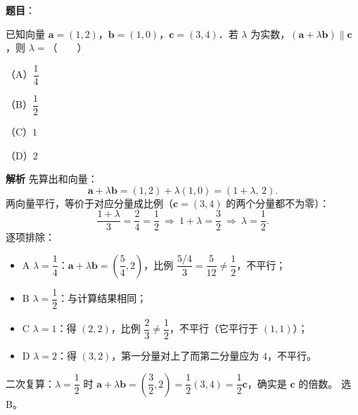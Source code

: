 \begin{answer}

\textbf{题目}：

已知向量 $\boldsymbol a=(1,2)$，$\boldsymbol b=(1,0)$，$\boldsymbol c=(3,4)$．若 $\lambda$ 为实数，$(\boldsymbol a+\lambda\boldsymbol b)\parallel\boldsymbol c$，则 $\lambda=$\mbox{（　　）}

（A）$\dfrac14$

（B）$\dfrac12$

（C）$1$

（D）$2$

\textbf{解析}
先算出和向量：
\nopagebreak[4]
\[
\boldsymbol a+\lambda\boldsymbol b=(1,2)+\lambda(1,0)=(1+\lambda,\,2).
\]
两向量平行，等价于对应分量成比例（$\boldsymbol c=(3,4)$ 的两个分量都不为零）：
\nopagebreak[4]
\[
\frac{1+\lambda}{3}=\frac{2}{4}=\frac12\ \Longrightarrow\ 1+\lambda=\frac32\ \Longrightarrow\ \lambda=\frac12.
\]
逐项排除：
\begin{itemize}
\item A $\lambda=\dfrac14$：$\boldsymbol a+\lambda\boldsymbol b=\left(\dfrac54,2\right)$，比例 $\dfrac{5/4}{3}=\dfrac{5}{12}\neq\dfrac12$，不平行；
\item B $\lambda=\dfrac12$：与计算结果相同；
\item C $\lambda=1$：得 $(2,2)$，比例 $\dfrac23\neq\dfrac12$，不平行（它平行于 $(1,1)$）；
\item D $\lambda=2$：得 $(3,2)$，第一分量对上了而第二分量应为 $4$，不平行。
\end{itemize}
二次复算：$\lambda=\dfrac12$ 时 $\boldsymbol a+\lambda\boldsymbol b=\left(\dfrac32,2\right)=\dfrac12(3,4)=\dfrac12\boldsymbol c$，确实是 $\boldsymbol c$ 的倍数。
选 B。


\end{answer}
